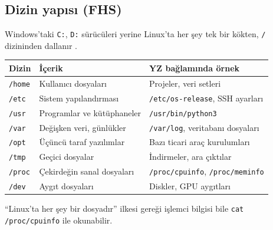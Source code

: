\documentclass[11pt,a4paper]{article}
\begin{document}
\subsection{Dizin yapısı (FHS)}
Windows'taki \texttt{C:}, \texttt{D:} sürücüleri yerine Linux'ta her şey tek bir kökten, \texttt{/} dizininden dallanır \cite{fhs}.
\begin{center}
\begin{tabularx}{\textwidth}{@{}l Y Y@{}}
\toprule
\textbf{Dizin} & \textbf{İçerik} & \textbf{YZ bağlamında örnek} \\
\midrule
\texttt{/home} & Kullanıcı dosyaları & Projeler, veri setleri \\
\texttt{/etc} & Sistem yapılandırması & \texttt{/etc/os-release}, SSH ayarları \\
\texttt{/usr} & Programlar ve kütüphaneler & \texttt{/usr/bin/python3} \\
\texttt{/var} & Değişken veri, günlükler & \texttt{/var/log}, veritabanı dosyaları \\
\texttt{/opt} & Üçüncü taraf yazılımlar & Bazı ticari araç kurulumları \\
\texttt{/tmp} & Geçici dosyalar & İndirmeler, ara çıktılar \\
\texttt{/proc} & Çekirdeğin sanal dosyaları & \texttt{/proc/cpuinfo}, \texttt{/proc/meminfo} \\
\texttt{/dev} & Aygıt dosyaları & Diskler, GPU aygıtları \\
\bottomrule
\end{tabularx}
\end{center}
``Linux'ta her şey bir dosyadır'' ilkesi gereği işlemci bilgisi bile \texttt{cat /proc/cpuinfo} ile okunabilir.
\end{document}
